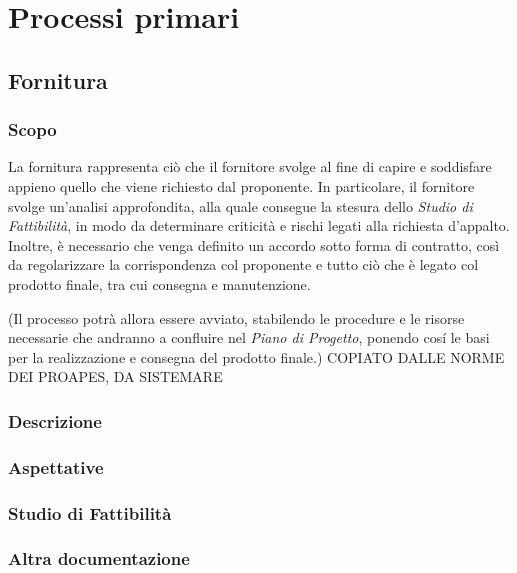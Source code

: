 \section{Processi primari}

\subsection{Fornitura}

\subsubsection{Scopo}

La fornitura rappresenta ciò che il fornitore svolge al fine di capire e soddisfare appieno quello che viene richiesto dal proponente.  In particolare,  il fornitore svolge un'analisi approfondita,  alla quale consegue la stesura dello \textit{Studio di Fattibilità},  in modo da determinare criticità e rischi legati alla richiesta d'appalto.  Inoltre,  è necessario che venga definito un accordo sotto forma di contratto,  così da regolarizzare la corrispondenza col proponente e tutto ciò che è legato col prodotto finale,  tra cui consegna e manutenzione.  \newline

(Il processo potrà allora essere avviato, stabilendo le procedure e le risorse necessarie che andranno a confluire nel \textit{Piano di Progetto}, ponendo cosí le basi per la realizzazione e consegna del prodotto finale.) \newline
COPIATO DALLE NORME DEI PROAPES,  DA SISTEMARE

\subsubsection{Descrizione}

\subsubsection{Aspettative}

\subsubsection{Studio di Fattibilità}

\subsubsection{Altra documentazione}

